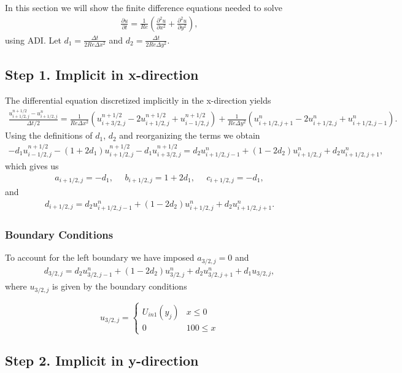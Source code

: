 In this section we will show the finite difference equations needed to solve
\begin{align*}
\frac{\partial u}{\partial t}=\frac{1}{Re}\left(\frac{\partial^2 u}{\partial x^2}+\frac{\partial^2 u}{\partial y^2}\right),
\end{align*}
using ADI. Let $d_1=\frac{\Delta t}{2Re\Delta x^2}$ and $d_2=\frac{\Delta t}{2Re\Delta y^2}$.
\subsection{Step 1. Implicit in x-direction}
The differential equation discretized implicitly in the x-direction yields
\begin{align*}
\frac{u_{i+1/2,j}^{n+1/2}-u_{i+1/2,j}^n}{\Delta t/2}=\frac{1}{Re\Delta x^2}\left(u_{i+3/2,j}^{n+1/2}-2u_{i+1/2,j}^{n+1/2}+u_{i-1/2,j}^{n+1/2}\right)+\frac{1}{Re\Delta y^2}\left(u_{i+1/2,j+1}^{n}-2u_{i+1/2,j}^{n}+u_{i+1/2,j-1}^{n}\right).
\end{align*}
Using the definitions of $d_1$, $d_2$ and reorganizing the terms we obtain
\begin{align*}
-d_1u_{i-1/2,j}^{n+1/2}-(1+2d_1)u_{i+1/2,j}^{n+1/2}-d_1u_{i+3/2,j}^{n+1/2}=d_2u_{i+1/2,j-1}^n+(1-2d_2)u_{i+1/2,j}^n+d_2u_{i+1/2,j+1}^n,
\end{align*}
which gives us
\begin{align*}
a_{i+1/2,j}=-d_1,~~~~~~b_{i+1/2,j}=1+2d_1,~~~~~~c_{i+1/2,j}=-d_1,
\end{align*}
and
\begin{align*}
d_{i+1/2,j}=d_2u_{i+1/2,j-1}^n+(1-2d_2)u_{i+1/2,j}^n+d_2u_{i+1/2,j+1}^n.
\end{align*}
\subsubsection{Boundary Conditions}
To account for the left boundary we have imposed $a_{3/2,j}=0$ and 
\begin{align*}
d_{3/2,j}=d_2u_{3/2,j-1}^n+(1-2d_2)u_{3/2,j}^n+d_2u_{3/2,j+1}^n+d_1u_{3/2,j},
\end{align*}
where $u_{3/2,j}$ is given by the boundary conditions

\[ u_{3/2,j}=\begin{cases} 
      U_{in1}(y_j) & x\leq 0 \\
      0 & 100\leq x 
   \end{cases}
\]

\subsection{Step 2. Implicit in y-direction}
